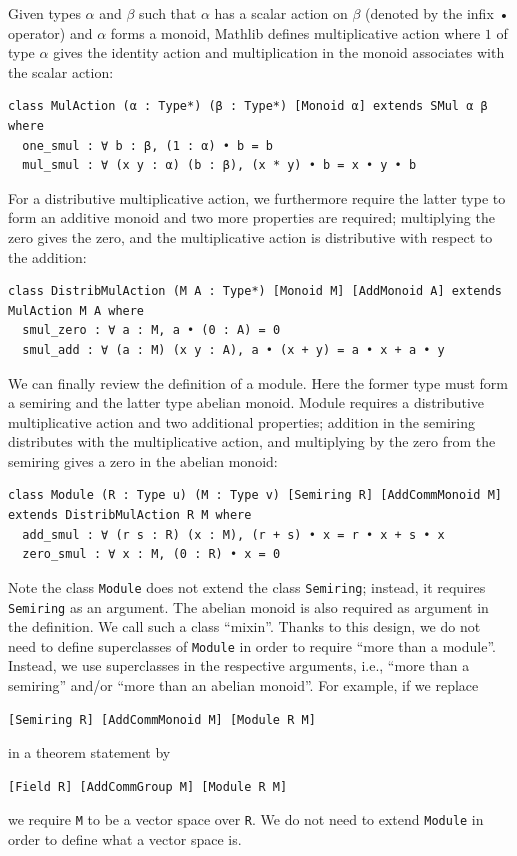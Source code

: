\documentclass[]{article}
\renewcommand{\.}{\hskip .75pt}
\begin{document}
Given types $\alpha$ and $\beta$ such that $\alpha$ has a scalar action on $\beta$
(denoted by the infix • operator)
and $\alpha$ forms a monoid, Mathlib defines multiplicative action where
$1$ of type $\alpha$ gives the identity action and multiplication in the monoid
associates with the scalar action:
\begin{lstlisting}
class MulAction (α : Type*) (β : Type*) [Monoid α] extends SMul α β where
  one_smul : ∀ b : β, (1 : α) • b = b
  mul_smul : ∀ (x y : α) (b : β), (x * y) • b = x • y • b
\end{lstlisting}
For a distributive multiplicative action, we furthermore require the latter type
to form an additive monoid and two more properties are required; multiplying the zero
gives the zero, and the multiplicative action is distributive with respect to the addition:
\begin{lstlisting}
class DistribMulAction (M A : Type*) [Monoid M] [AddMonoid A] extends MulAction M A where
  smul_zero : ∀ a : M, a • (0 : A) = 0
  smul_add : ∀ (a : M) (x y : A), a • (x + y) = a • x + a • y
\end{lstlisting}
We can finally review the definition of a module. Here the former type must form a semiring
and the latter type abelian monoid. Module requires a distributive multiplicative action and
two additional properties; addition in the semiring distributes with the multiplicative action,
and multiplying by the zero from the semiring gives a zero in the abelian monoid:
\begin{lstlisting}
class Module (R : Type u) (M : Type v) [Semiring R] [AddCommMonoid M] extends DistribMulAction R M where
  add_smul : ∀ (r s : R) (x : M), (r + s) • x = r • x + s • x
  zero_smul : ∀ x : M, (0 : R) • x = 0
\end{lstlisting}
Note the class \texttt{Module} does not extend the class \texttt{Semiring}; instead,
it requires \texttt{Semiring} as an argument.
The abelian monoid is also required as argument in the definition. We call such a class ``mixin''.
Thanks to this design, we do not need to define superclasses of \texttt{Module} in order to require
``more than a module''. Instead, we use superclasses in the respective arguments, i.e.,
``more than a semiring'' and/or ``more than an abelian monoid''. For example, if we replace
\begin{lstlisting}
[Semiring R] [AddCommMonoid M] [Module R M]
\end{lstlisting}
in a theorem statement by
\begin{lstlisting}
[Field R] [AddCommGroup M] [Module R M]
\end{lstlisting}
we require \texttt{M} to be a vector space over \texttt{R}. We do not need to extend
\texttt{Module} in order to define what a vector space is.
\end{document}
